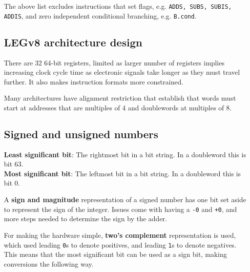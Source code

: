 \documentclass[11pt]{article}
\begin{document}
The above list excludes instructions that set flags, e.g. \texttt{ADDS, SUBS, SUBIS, ADDIS}, and zero independent conditional branching, e.g. \texttt{B.cond}.

\subsection*{LEGv8 architecture design}

There are 32 64-bit registers, limited as larger number of registers implies increasing clock cycle time as electronic signals take longer as they must travel further. It also makes instruction formats more constrained.

Many architectures have alignment restriction that establish that words must start at addresses that are multiples of 4 and doublewords at multiples of 8.

\pagebreak

\subsection*{Signed and unsigned numbers}

\begin{tcolorbox}[
    enhanced,
    attach boxed title to top left={xshift=6mm,yshift=-1.5mm},
    colback=moonstoneblue!20,
    colframe=moonstoneblue,
    colbacktitle=moonstoneblue,
    title=Denomination of bits in a bit string,
    fonttitle=\bfseries\color{white},
    boxed title style={size=small,colframe=moonstoneblue,sharp corners},
    sharp corners,
    label=box:logic-types,
]
    {\color{moondark}\textbf{Least significant bit}}: The rightmost bit in a bit string. In a doubleword this is bit 63. \\
    {\color{moondark}\textbf{Most significant bit}}: The leftmost bit in a bit string. In a doubleword this is bit 0.
\end{tcolorbox}

A \textbf{sign and magnitude} representation of a signed number has one bit set aside to represent the sign of the integer. Issues come with having a \texttt{-0} and \texttt{+0}, and more steps needed to determine the sign by the adder.

For making the hardware simple, \textbf{two's complement} representation is used, which used leading \texttt{0}s to denote positives, and leading \texttt{1}s to denote negatives. This means that the most significant bit can be used as a sign bit, making conversions the following way.
\end{document}
